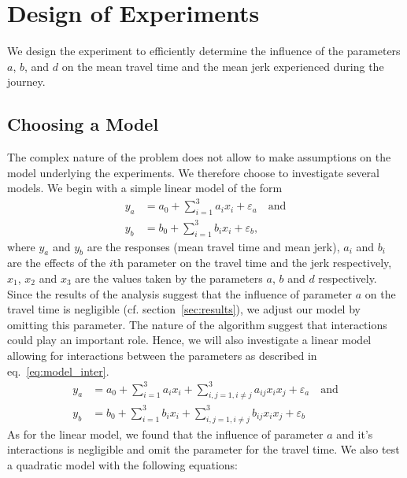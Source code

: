 \section{Design of Experiments}

We design the experiment to efficiently determine the influence of the  parameters $a$, $b$, and $d$ on the mean travel time and the mean jerk experienced during the journey.

\subsection{Choosing a Model}
The complex nature of the problem does not allow to make assumptions on the model underlying the experiments. We therefore choose to investigate several models. We begin with a simple linear model of the form
\begin{subequations}\label{eq:model_lin}
\begin{align}
	y_a &= a_0 + \displaystyle\sum_{i=1}^{3} a_i x_i + \varepsilon_a \quad \text{and}\\ 
	y_b &= b_0 + \displaystyle\sum_{i=1}^{3} b_i x_i + \varepsilon_b,
\end{align}
\end{subequations}
where $y_a$ and $y_b$ are the responses (mean travel time and mean jerk), $a_i$ and $b_i$ are the effects of the $i$th parameter on the travel time and the jerk respectively, $x_1$, $x_2$ and $x_3$ are the values taken by the parameters $a$, $b$ and $d$ respectively. Since the results of the analysis suggest that the influence of parameter $a$ on the travel time is negligible (cf. section~\ref{sec:results}), we adjust our model by omitting this parameter.
The nature of the algorithm suggest that interactions could play an important role. Hence, we will also investigate a linear model allowing for interactions between the parameters as described in eq.~\ref{eq:model_inter}.
\begin{subequations}\label{eq:model_inter}
\begin{align}
	y_a &= a_0 + \displaystyle\sum_{i=1}^{3} a_i x_i + \displaystyle\sum_{i,j=1, i \neq j}^{3} a_{ij} x_i x_j + \varepsilon_a \quad \text{and}\\ 
	y_b &= b_0 + \displaystyle\sum_{i=1}^{3} b_i x_i + \displaystyle\sum_{i,j=1, i \neq j}^{3} b_{ij} x_i x_j + \varepsilon_b
\end{align}
\end{subequations}
As for the linear model, we found that the influence of parameter $a$ and it's interactions is negligible and omit the parameter for the travel time. We also test a quadratic model with the following equations:
